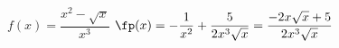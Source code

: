 {$f(x)=\dfrac{x^2-\sqrt x}{x^3}$}
{$\fp(x)=-\dfrac1{x^2}+\dfrac5{2x^3\sqrt x}=\dfrac{-2x\sqrt x +5}{2x^3\sqrt x}$}
